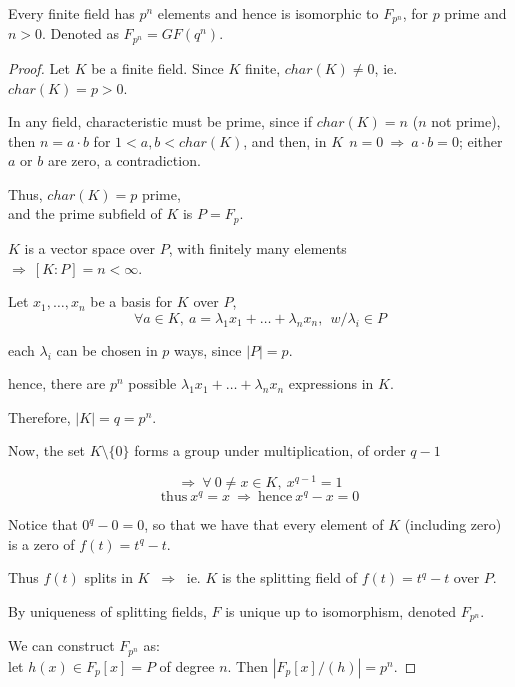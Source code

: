 \documentclass{article}
\theoremstyle{definition}
\newenvironment{thm}[1]
{\renewcommand\theinnerthm{#1}\innerthm}
{\endinnerthm}
\begin{document}
\begin{thm}{$(F_p^n)$}
  Every finite field has $p^n$ elements and hence is isomorphic to $F_{p^n}$,
  for $p$ prime and $n>0$. Denoted as $F_{p^n} = GF(q^n)$.
\end{thm}
\begin{proof}
  Let $K$ be a finite field. Since $K$ finite, $char(K) \neq 0$, ie. $char(K)=p >0$.

  In any field, characteristic must be prime, since if $char(K)=n$ ($n$ not prime), then $n=a \cdot b$ for $1 <a, b < char(K)$, and then, in $K~~ n=0 ~\Longrightarrow~ a \cdot b = 0$; either $a$ or $b$ are zero, a contradiction.

  Thus, $char(K)=p$ prime,\\
  and the prime subfield of $K$ is $P=F_p$.

  $K$ is a vector space over $P$, with finitely many elements\\
  \hspace*{2em} $\Longrightarrow~ [K:P]=n < \infty$.

  Let $x_1, \ldots, x_n$ be a basis for $K$ over $P$,
  $$\forall a \in K, ~ a= \lambda_1 x_1 + \ldots + \lambda_n x_n, ~~w/ \lambda_i \in P$$

  each $\lambda_i$ can be chosen in $p$ ways, since $|P|=p$.

  hence, there are $p^n$ possible $\lambda_1 x_1 + \ldots + \lambda_n x_n$ expressions in $K$.

  Therefore, $|K|=q=p^n$.

  \vspace{0.4cm}
  Now, the set $K \setminus \{0\}$ forms a group under multiplication, of order $q-1$

  $$\Longrightarrow~ \forall~ 0 \neq x \in K,~ x^{q-1}=1$$
  $$\text{thus}~ x^q=x~ \Longrightarrow~\text{hence}~ x^q-x=0$$

  Notice that $0^q-0=0$, so that we have that every element of $K$ (including zero) is a zero of $f(t)=t^q-t$.

  Thus $f(t)$ splits in $K$ $~\Longrightarrow~$ ie. $K$ is the splitting field of $f(t)=t^q-t$ over $P$.

  By uniqueness of splitting fields, $F$ is unique up to isomorphism, denoted $F_{p^n}$.

  \vspace{0.4cm}
  We can construct $F_{p^n}$ as:\\
  let $h(x) \in F_p[x]=P$ of degree $n$. Then $|F_p[x] / (h)| = p^n$.
\end{proof}
\end{document}
